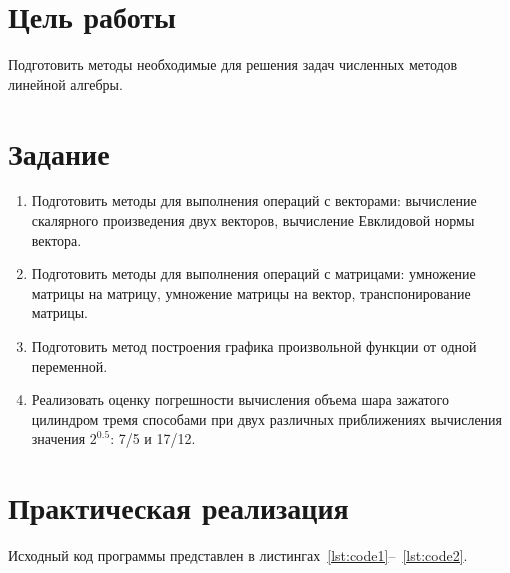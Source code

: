 \documentclass[a4paper, 14pt]{extarticle}
\begin{document}
\renewcommand{\ttdefault}{pcr}

\setlength{\tabcolsep}{3pt}
\newpage
\setcounter{page}{2}

\section{Цель работы}\label{Sect::goal}

Подготовить методы необходимые для решения задач численных методов
линейной алгебры.

\section{Задание}\label{Sect::task}

\begin{enumerate}
    \item Подготовить методы для выполнения операций с векторами: вычисление скалярного произведения двух векторов, вычисление Евклидовой нормы вектора.
    \item Подготовить методы для выполнения операций с матрицами: умножение матрицы на матрицу, умножение матрицы на вектор, транспонирование матрицы.
    \item Подготовить метод построения графика произвольной функции от одной переменной.
    \item Реализовать оценку погрешности вычисления объема шара зажатого цилиндром тремя способами при двух различных приближениях вычисления значения $2^{0.5}$: 7/5 и 17/12.
\end{enumerate}

\section{Практическая реализация}\label{Sect::code}

Исходный код программы представлен в листингах~\ref{lst:code1}--~\ref{lst:code2}.
\end{document}
